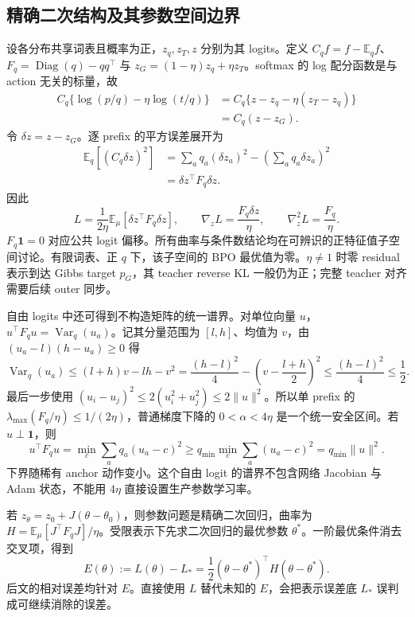 \documentclass[lang=cn,scheme=chinese,openany]{../book/elegantbook}
\newcommand{\E}{\mathbb E}
\begin{document}
\subsection{精确二次结构及其参数空间边界}

设各分布共享词表且概率为正，$z_q,z_T,z$ 分别为其 logits。定义 $C_q f=f-\E_q f$、$F_q=\operatorname{Diag}(q)-qq^\top$ 与 $z_G=(1-\eta)z_q+\eta z_T$。softmax 的 log 配分函数是与 action 无关的标量，故
\begin{align}
C_q\{\log(p/q)-\eta\log(t/q)\}
&=C_q\{z-z_q-\eta(z_T-z_q)\}\\
&=C_q(z-z_G).
\end{align}
令 $\delta z=z-z_G$。逐 prefix 的平方误差展开为
\begin{align}
\E_q[(C_q\delta z)^2]
&=\sum_a q_a(\delta z_a)^2-\left(\sum_a q_a\delta z_a\right)^2\\
&=\delta z^\top F_q\delta z.
\end{align}
因此
\begin{equation}
L=\frac{1}{2\eta}\E_\mu[\delta z^\top F_q\delta z],\qquad
\nabla_z L=\frac{F_q\delta z}{\eta},\qquad
\nabla_z^2L=\frac{F_q}{\eta}.
\end{equation}
$F_q\mathbf1=0$ 对应公共 logit 偏移。所有曲率与条件数结论均在可辨识的正特征值子空间讨论。有限词表、正 $q$ 下，该子空间的 BPO 最优值为零。$\eta\ne1$ 时零 residual 表示到达 Gibbs target $p_G$，其 teacher reverse KL 一般仍为正；完整 teacher 对齐需要后续 outer 同步。

自由 logits 中还可得到不构造矩阵的统一谱界。对单位向量 $u$，$u^\top F_qu=\operatorname{Var}_q(u_a)$。记其分量范围为 $[l,h]$、均值为 $v$，由 $(u_a-l)(h-u_a)\ge0$ 得
\begin{equation}
\operatorname{Var}_q(u_a)\le(l+h)v-lh-v^2
=\frac{(h-l)^2}{4}-\left(v-\frac{l+h}{2}\right)^2
\le\frac{(h-l)^2}{4}\le\frac12.
\end{equation}
最后一步使用 $(u_i-u_j)^2\le2(u_i^2+u_j^2)\le2\|u\|^2$。所以单 prefix 的 $\lambda_{\max}(F_q/\eta)\le1/(2\eta)$，普通梯度下降的 $0<\alpha<4\eta$ 是一个统一安全区间。若 $u\perp\mathbf1$，则
\begin{equation}
u^\top F_qu=\min_c\sum_aq_a(u_a-c)^2
\ge q_{\min}\min_c\sum_a(u_a-c)^2=q_{\min}\|u\|^2.
\end{equation}
下界随稀有 anchor 动作变小。这个自由 logit 的谱界不包含网络 Jacobian 与 Adam 状态，不能用 $4\eta$ 直接设置生产参数学习率。

若 $z_\theta=z_0+J(\theta-\theta_0)$，则参数问题是精确二次回归，曲率为 $H=\E_\mu[J^\top F_qJ]/\eta$。受限表示下先求二次回归的最优参数 $\theta^*$。一阶最优条件消去交叉项，得到
\begin{equation}
E(\theta):=L(\theta)-L_*=
\frac12(\theta-\theta^*)^\top H(\theta-\theta^*).
\end{equation}
后文的相对误差均针对 $E$。直接使用 $L$ 替代未知的 $E$，会把表示误差底 $L_*$ 误判成可继续消除的误差。
\end{document}
